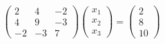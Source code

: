 \documentclass[preview]{standalone}
\begin{document}
\begin{align*}
\begin{pmatrix}2 & 4 & -2\\4 & 9 & -3\\-2 & -3 & 7\end{pmatrix} \begin{pmatrix}x_1\\x_2\\x_3\end{pmatrix} = \begin{pmatrix}2\\8\\10\end{pmatrix}
\end{align*}
\end{document}
